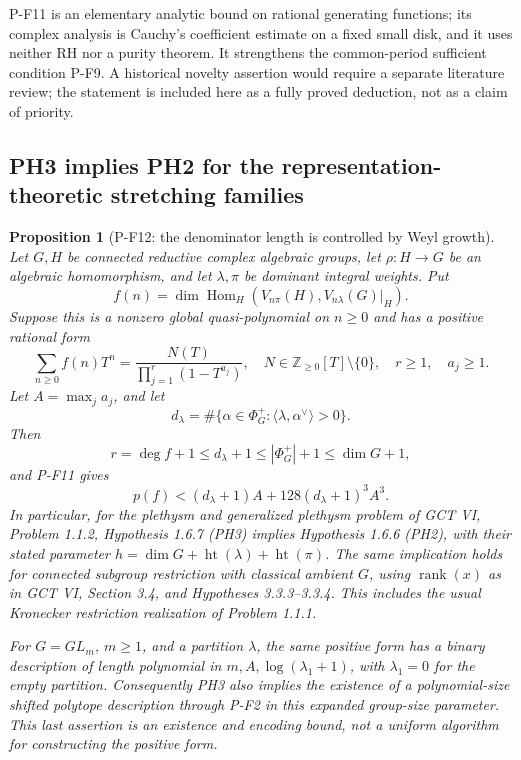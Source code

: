 \documentclass[11pt,a4paper]{article}
\newtheorem{proposition}{Proposition}[section]
\begin{document}
P-F11 is an elementary analytic bound on rational generating functions;
its complex analysis is Cauchy's coefficient estimate on a fixed small
disk, and it uses neither RH nor a purity theorem. It strengthens the
common-period sufficient condition P-F9. A historical novelty assertion
would require a separate literature review; the statement is included
here as a fully proved deduction, not as a claim of priority.


\subsection{PH3 implies PH2 for the representation-theoretic stretching families}

\begin{proposition}[P-F12: the denominator length is controlled by Weyl growth]
\label{prop:ph3ph2}
Let $G,H$ be connected reductive complex algebraic groups, let
$\rho:H\to G$ be an algebraic homomorphism, and let $\lambda,\pi$ be
dominant integral weights. Put
\[
 f(n)=\dim\operatorname{Hom}_H
       (V_{n\pi}(H),V_{n\lambda}(G)|_H).
\]
Suppose this is a nonzero global quasi-polynomial on $n\ge0$ and has a
positive rational form
\[
 \sum_{n\ge0}f(n)T^n
 =\frac{N(T)}{\prod_{j=1}^{r}(1-T^{a_j})},
 \quad N\in\mathbb Z_{\ge0}[T]\setminus\{0\},\quad r\ge1,
 \quad a_j\ge1.
\]
Let $A=\max_j a_j$, and let
\[
 d_\lambda
 =\#\{\alpha\in\Phi_G^+:\langle\lambda,\alpha^\vee\rangle>0\}.
\]
Then
\[
 r=\deg f+1\le d_\lambda+1\le|\Phi_G^+|+1\le\dim G+1,
\]
and P-F11 gives
\[
 p(f)<(d_\lambda+1)A+128(d_\lambda+1)^3A^3.
 \tag{P-F12a}
\]
In particular, for the plethysm and generalized plethysm problem of
GCT VI, Problem 1.1.2, Hypothesis 1.6.7 (PH3) implies Hypothesis 1.6.6
(PH2), with their stated parameter
$h=\dim G+\operatorname{ht}(\lambda)+\operatorname{ht}(\pi)$.
The same implication holds for connected subgroup restriction with
classical ambient $G$, using $\operatorname{rank}(x)$ as in GCT VI,
Section 3.4, and Hypotheses 3.3.3--3.3.4. This includes the usual
Kronecker restriction realization of Problem 1.1.1.

For $G=GL_m$, $m\ge1$, and a partition $\lambda$, the same positive form has a
binary description of length polynomial in
$m,A,\log(\lambda_1+1)$, with $\lambda_1=0$ for the empty partition.
Consequently PH3 also implies the existence of a polynomial-size shifted
polytope description through P-F2 in this expanded group-size parameter.
This last assertion is an existence and encoding bound, not a uniform
algorithm for constructing the positive form.
\end{proposition}
\end{document}
